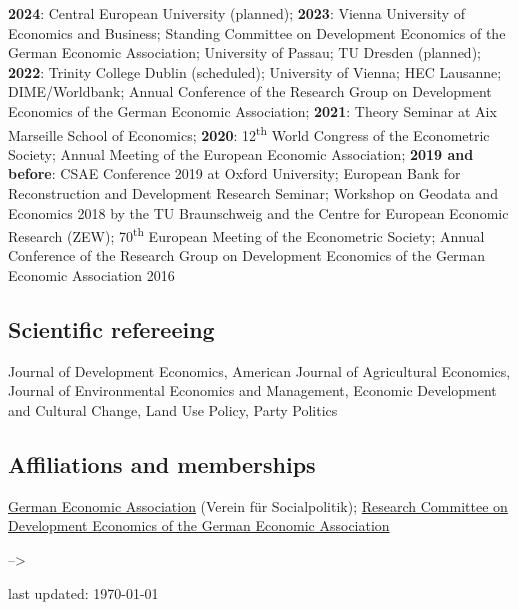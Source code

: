 \documentclass[
  a4paper,10pt]{article}
\begin{document}
\textbf{2024}: Central European University (planned); \textbf{2023}:
Vienna University of Economics and Business; Standing Committee on
Development Economics of the German Economic Association; University of
Passau; TU Dresden (planned); \textbf{2022}: Trinity College Dublin
(scheduled); University of Vienna; HEC Lausanne; DIME/Worldbank; Annual
Conference of the Research Group on Development Economics of the German
Economic Association; \textbf{2021}: Theory Seminar at Aix Marseille
School of Economics; \textbf{2020}: 12\textsuperscript{th} World
Congress of the Econometric Society; Annual Meeting of the European
Economic Association; \textbf{2019 and before}: CSAE Conference 2019 at
Oxford University; European Bank for Reconstruction and Development
Research Seminar; Workshop on Geodata and Economics 2018 by the TU
Braunschweig and the Centre for European Economic Research (ZEW);
70\textsuperscript{th} European Meeting of the Econometric Society;
Annual Conference of the Research Group on Development Economics of the
German Economic Association 2016

\hypertarget{scientific-refereeing}{%
\subsection{Scientific refereeing}\label{scientific-refereeing}}

Journal of Development Economics, American Journal of Agricultural
Economics, Journal of Environmental Economics and Management, Economic
Development and Cultural Change, Land Use Policy, Party Politics

\hypertarget{affiliations-and-memberships}{%
\subsection{Affiliations and
memberships}\label{affiliations-and-memberships}}

\href{https://www.socialpolitik.de/}{German Economic Association}
(Verein für Socialpolitik);
\href{http://entwicklungsoekonomischer-ausschuss.de/?lang=en}{Research
Committee on Development Economics of the German Economic Association}

--\textgreater{}

\vfill\hfill\tiny last updated: \today
\end{document}
